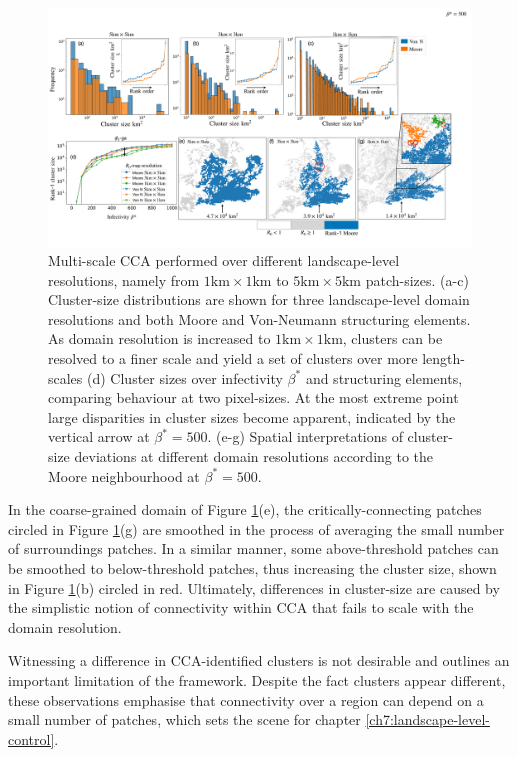 \begin{landscape}
\begin{figure}
    \centering
    \includegraphics[scale=0.395]{chapter6/figures/fig6-ga-cluster-distribution.pdf} 
    \caption{Multi-scale CCA performed over different landscape-level resolutions, namely from $\mathrm{1km \times 1km}$ to $\mathrm{5km \times 5km}$ patch-sizes. (a-c) Cluster-size distributions are shown for three landscape-level domain resolutions and both Moore and Von-Neumann structuring elements. As domain resolution is increased to $\mathrm{1km \times 1km}$, clusters can be resolved to a finer scale and yield a set of clusters over more length-scales (d) Cluster sizes over infectivity $\beta^*$ and structuring elements, comparing behaviour at two pixel-sizes. At the most extreme point large disparities in cluster sizes become apparent, indicated by the vertical arrow at $\beta^*=500$. (e-g) Spatial interpretations of cluster-size deviations at different domain resolutions according to the Moore neighbourhood at $\beta^*=500$.}
    \label{fig:gaussian-clustering}
\end{figure}
\end{landscape}

In the coarse-grained domain of Figure \ref{fig:gaussian-clustering}(e), the critically-connecting patches circled in Figure \ref{fig:gaussian-clustering}(g) 
are smoothed in the process of averaging the small number of surroundings patches. 
In a similar manner, some above-threshold patches can be smoothed to below-threshold patches, thus increasing the cluster size, shown in Figure \ref{fig:gaussian-clustering}(b) circled in red.
Ultimately, differences in cluster-size are caused by the simplistic notion of connectivity within CCA that fails to scale with the domain resolution.

Witnessing a difference in CCA-identified clusters is not desirable and outlines an important limitation of the framework.
Despite the fact clusters appear different, these observations emphasise that connectivity over a region can depend on a small number of patches, 
which sets the scene for chapter \ref{ch7:landscape-level-control}.


